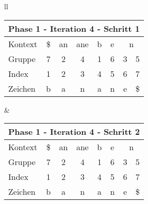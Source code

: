 \begin{table}[H]

\centering
\begin{adjustbox}{max width=\textwidth}
\begin{tabular}{ll}

\begin{tabular}{lccccccc}
\multicolumn{8}{l}{Phase 1 - Iteration 4 - Schritt 1}                                                                                                                                                          \\ \hline
\multicolumn{1}{l|}{Kontext} & \multicolumn{1}{c|}{\$} & \multicolumn{1}{c|}{an} & \multicolumn{1}{c|}{\cellcolor[HTML]{\green}ane} & \multicolumn{1}{c|}{b} & \multicolumn{1}{c|}{e} & \multicolumn{2}{c}{n} \\
\multicolumn{1}{l|}{Gruppe}  & \multicolumn{1}{c|}{7}  & \multicolumn{1}{c|}{2}  & \multicolumn{1}{c|}{\cellcolor[HTML]{\green}4}   & \multicolumn{1}{c|}{1} & \multicolumn{1}{c|}{6} & 3         & 5          \\ \hline
\multicolumn{1}{l|}{Index}   & 1                       & 2                       & 3                                                & 4                      & 5                      & 6         & 7          \\
\multicolumn{1}{l|}{Zeichen} & b                       & a                       & n                                                & a                      & n                      & e         & \$        
\end{tabular}

&

\begin{tabular}{lccccccc}
\multicolumn{8}{l}{Phase 1 - Iteration 4 - Schritt 2}                                                                                                                                                                        \\ \hline
\multicolumn{1}{l|}{Kontext} & \multicolumn{1}{c|}{\$} & \multicolumn{1}{c|}{an} & \multicolumn{1}{c|}{\cellcolor[HTML]{\green}ane} & \multicolumn{1}{c|}{b}    & \multicolumn{1}{c|}{e}    & \multicolumn{2}{c}{n}         \\
\multicolumn{1}{l|}{Gruppe}  & \multicolumn{1}{c|}{7}  & \multicolumn{1}{c|}{2}  & \multicolumn{1}{c|}{\cellcolor[HTML]{\green}4}   & \multicolumn{1}{c|}{1}    & \multicolumn{1}{c|}{6}    & 3                         & 5  \\ \hline
\multicolumn{1}{l|}{Index}   & 1                       & 2                       & 3                                                & \cellcolor[HTML]{\green}4 & \cellcolor[HTML]{\green}5 & \cellcolor[HTML]{\green}6 & 7  \\
\multicolumn{1}{l|}{Zeichen} & b                       & a                       & n                                                & \cellcolor[HTML]{\green}a & \cellcolor[HTML]{\green}n & \cellcolor[HTML]{\green}e & \$
\end{tabular}


\end{tabular}
\end{adjustbox}
\end{table}
